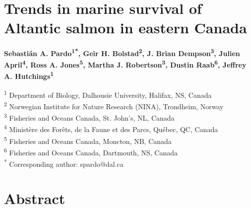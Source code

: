 \documentclass[12pt]{article}
\begin{document}
\linenumbers


\section*{Trends in marine survival of Altantic salmon in eastern Canada}

\textbf{Sebasti\'{a}n A. Pardo\textsuperscript{1*}, 
        Geir H. Bolstad\textsuperscript{2}, 
        J. Brian Dempson\textsuperscript{3}, 
        Julien April\textsuperscript{4}, 
        Ross A. Jones\textsuperscript{5}, 
        Martha J. Robertson\textsuperscript{3}, 
        Dustin Raab\textsuperscript{6}, 
Jeffrey A. Hutchings\textsuperscript{1}} 

\noindent\small{\textsuperscript{1} Department of Biology, Dalhousie University, Halifax, NS, Canada\\}
\small{\textsuperscript{2} Norwegian Institute for Nature Research (NINA), Trondheim, Norway\\}
\small{\textsuperscript{3} Fisheries and Oceans Canada, St. John's, NL, Canada\\}
\small{\textsuperscript{4} Minist\`{e}re des For\^{e}ts, de la Faune et des Parcs, Qu\'{e}bec, QC, Canada\\}
\small{\textsuperscript{5} Fisheries and Oceans Canada, Moncton, NB, Canada\\}
\small{\textsuperscript{6} Fisheries and Oceans Canada, Dartmouth, NS, Canada\\}
\small{\textsuperscript{*} Corresponding author: spardo@dal.ca}

\section*{Abstract}
\end{document}
